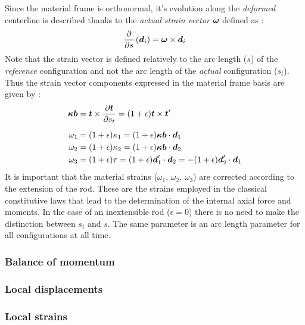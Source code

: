 Since the material frame is orthonormal, it's evolution along the \emph{deformed} centerline is described thanks to the \emph{actual strain vector} ${\boldsymbol{\omega}}$ defined as :
\begin{equation}
	\frac{\partial}{\partial s}\left(\boldsymbol{d}_i\right) = {\boldsymbol{\omega}}  \times \boldsymbol{d}_i
\end{equation}
Note that the strain vector is defined relatively to the arc length ($s$) of the \emph{reference} configuration and not the arc length of the \emph{actual} configuration  ($s_t$). Thus the strain vector components expressed in the material frame basis are given by :
\begin{subequations}
	\begin{align}
		\boldsymbol{\kappa b} &=  \boldsymbol{t} \times  \frac{\partial \boldsymbol{t}}{\partial s_t} = (1+\epsilon) \boldsymbol{t} \times \boldsymbol{t}'
		\\[0.5em]
		{\omega}_1 &= (1+\epsilon) {\kappa_1} = (1+\epsilon) \boldsymbol{\kappa b} \cdot \boldsymbol{d}_1
		\\
		{\omega}_2 &= (1+\epsilon) {\kappa_2} = (1+\epsilon) \boldsymbol{\kappa b} \cdot \boldsymbol{d}_2
		\\
		{\omega}_3 &= (1+\epsilon) {\tau} = (1+\epsilon) \boldsymbol{d}'_1  \cdot \boldsymbol{d}_2 = - (1+\epsilon) \boldsymbol{d}'_2  \cdot \boldsymbol{d}_1
	\end{align}
\end{subequations}
It is important that the material strains ($\omega_1$, $\omega_2$, $\omega_3$) are corrected according to the extension of the rod. These are the strains employed in the classical constitutive laws that lead to the determination of the internal axial force and moments. In the case of an inextensible rod ($\epsilon = 0$) there is no need to make the distinction between $s_t$ and $s$. The same parameter is an arc length parameter for all configurations at all time.


\subsubsection{Balance of momentum}

\subsubsection{Local displacements}

\subsubsection{Local strains}

